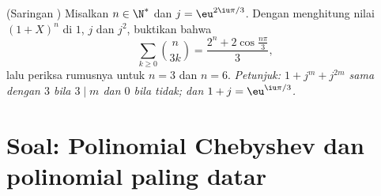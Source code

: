 \begin{exercise}[$\star\star$]\label{exo:b1:poly:12}
(Saringan ) Misalkan $n \in \N^*$ dan $j = \eu^{2\iu\pi/3}$.
Dengan menghitung nilai $(1 + X)^n$ di $1$, $j$ dan $j^2$, buktikan bahwa
\[
\sum_{k \geq 0} \binom{n}{3k}
= \frac{2^n + 2\cos\frac{n\pi}{3}}{3} ,
\]
lalu periksa rumusnya untuk $n = 3$ dan $n = 6$. \emph{Petunjuk: $1 +
j^m + j^{2m}$ sama dengan $3$ bila $3 \mid m$ dan $0$ bila tidak; dan $1 +
j = \eu^{\iu\pi/3}$.}
\end{exercise}

\section{Soal: Polinomial Chebyshev dan polinomial paling datar}

